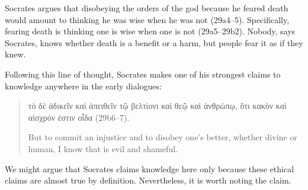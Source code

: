 \documentclass[11pt]{article}
\begin{document}
Socrates argues that disobeying the orders of the god because he feared
death would amount to thinking he was wise when he was not (29a4--5).
Specifically, fearing death is thinking one is wise when one is not
(29a5--29b2).  Nobody, says Socrates, knows whether death is a benefit or
a harm, but people fear it as if they knew.

Following this line of thought, Socrates makes one of his strongest claims
to knowledge anywhere in the early dialogues:

\begin{quote}
    τὸ δὲ ἀδικεῖν καὶ ἀπειθεῖν τῷ βελτίονι καὶ θεῷ καὶ ἀνθρώπῳ, ὅτι κακὸν
    καὶ αἰσχρόν ἐστιν οἶδα (29b6--7).

    But to commit an injustice and to disobey one's better, whether divine
    or human, I know that is evil and shameful.
\end{quote}

We might argue that Socrates claims knowledge here only because these
ethical claims are almost true by definition.  Nevertheless, it is worth
noting the claim.




\newpage


\end{document}
